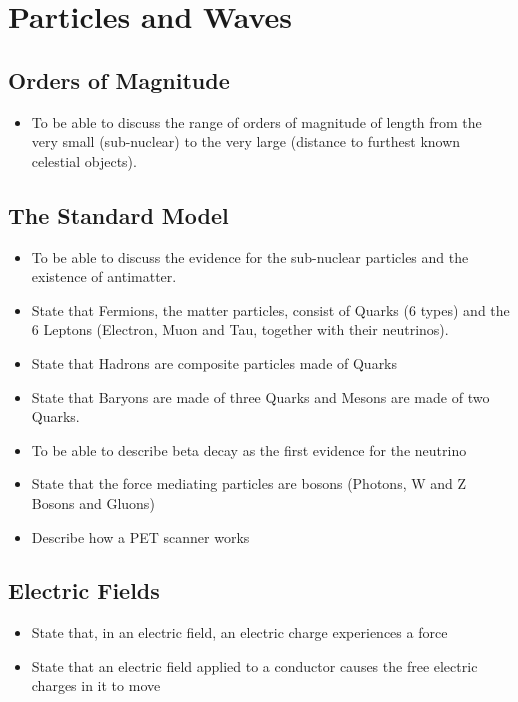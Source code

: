 \chapter{Particles and Waves}

\section{Orders of Magnitude}
	\begin{itemize}
        \item To be able to discuss the range of orders of magnitude of length 
            from the very small (sub-nuclear) to the very large (distance to 
            furthest known celestial objects).
	\end{itemize}

\section{The Standard Model}
\begin{multicols}{2}
	\begin{itemize}
        \item To be able to discuss the evidence for the sub-nuclear particles 
            and the existence of antimatter.

        \item State that Fermions, the matter particles, consist of Quarks 
            (6 types) and the 6 Leptons (Electron, Muon and Tau, together with 
            their neutrinos).

        \item State that Hadrons are composite particles made of Quarks

        \item State that Baryons are made of three Quarks and Mesons are made 
             of two Quarks.

        \item To be able to describe beta decay as the first evidence for the 
             neutrino
        \item State that the force mediating particles are bosons (Photons, W 
            and Z Bosons and Gluons)
        \item Describe how a PET scanner works
	\end{itemize}
\end{multicols}

\section{Electric Fields}
\begin{multicols}{2}
	\begin{itemize}
        \item State that, in an electric field, an electric charge experiences
            a force
        \item State that an electric field applied to a conductor causes the 
            free electric charges in it to move
	\end{itemize}
\end{multicols}

